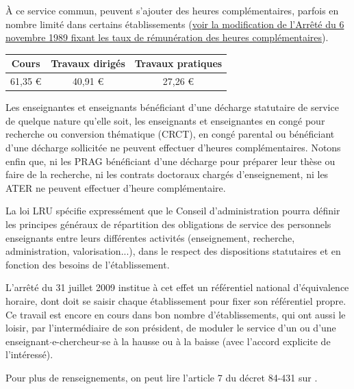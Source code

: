 \`A ce service commun, peuvent s'ajouter des heures
compl\'ementaires, parfois en nombre limit\'e dans certains \'etablissements (\href{http://www.legifrance.gouv.fr/affichTexte.do?cidTexte=JORFTEXT000000315917&dateTexte=20121122}{voir la modification de l'Arr\^et\'e du 6 novembre 1989 fixant les taux de r\'emun\'eration des heures compl\'ementaires}).

\begin{table}[!ht]
\begin{center}
\begin{tabular}{|c|c|c|}
\hline
Cours & Travaux dirig\'es & Travaux pratiques\\
\hline
61,35 \euro & 40,91 \euro & 27,26 \euro\\
\hline
\end{tabular}
\end{center}
\end{table}
Les enseignantes et enseignants b\'en\'eficiant d'une d\'echarge statutaire de service de quelque
nature qu'elle soit, les enseignants et enseignantes en cong\'e pour recherche ou
conversion th\'ematique (CRCT), en cong\'e parental ou b\'en\'eficiant d'une
d\'echarge sollicit\'ee ne peuvent effectuer d'heures
compl\'ementaires. Notons enfin
que, ni les PRAG b\'en\'eficiant d'une d\'echarge pour
pr\'eparer leur th\`ese ou faire de la recherche,
ni les contrats doctoraux charg\'es d'enseignement,
ni les ATER ne peuvent effectuer d'heure compl\'ementaire.

La loi LRU sp\'ecifie express\'ement que le Conseil
d'administration pourra d\'efinir les principes g\'en\'eraux de
r\'epartition des obligations de service des personnels enseignants
entre leurs diff\'erentes activit\'es (enseignement, recherche,
administration, valorisation...), dans le respect des dispositions
statutaires et en fonction des besoins de l'\'etablissement.

\label{referentiel}
L'arr\^et\'e du 31 juillet 2009 institue \`a cet effet un r\'ef\'erentiel
national d'\'equivalence horaire, dont doit se saisir chaque \'etablissement
pour fixer son r\'ef\'erentiel propre. Ce travail est encore en cours dans bon nombre
d'\'etablissements, qui ont aussi le loisir, par l'interm\'ediaire de son pr\'esident,
de moduler le service d'un ou d'une enseignant$\cdot$e-chercheur$\cdot$se \`a la hausse ou \`a la baisse (avec l'accord
explicite de l'int\'eress\'e).

Pour plus de renseignements, on peut lire l'article 7 du d\'ecret 84-431 sur
.

